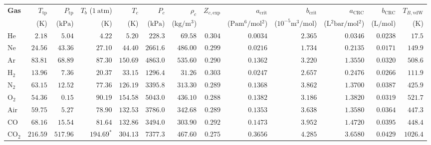 \begin{table}[!htbp]
\centering
{}\label{tab:06:vdw-constants}
\footnotesize\setlength{\tabcolsep}{3.5pt}\renewcommand{\arraystretch}{1.08}
\begin{tabularx}{\linewidth}{@{}l r r r r r r r r r r r r@{}}
\toprule
\textbf{Gas} & $T_{\mathrm{tp}}$ & $P_{\mathrm{tp}}$ & $T_b$ ($\SI{1}{\text{atm}}$) & $T_c$ & $P_c$ & $\rho_c$ & $Z_{c,\mathrm{exp}}$ & $a_{\mathrm{crit}}$ & $b_{\mathrm{crit}}$ & $a_{\mathrm{CRC}}$ & $b_{\mathrm{CRC}}$ & $T_{B,\mathrm{vdW}}$ \\
 & ($\si{\kelvin}$) & ($\si{\kilo\pascal}$) & ($\si{\kelvin}$) & ($\si{\kelvin}$) & ($\si{\kilo\pascal}$) & ($\si{\kilogram\per\cubic\meter}$) & & ($\si{\pascal\meter^6\per\mole^2}$) & ($10^{-5}\si{\cubic\meter\per\mole}$) & ($\si{\liter^2\bar\per\mole^2}$) & ($\si{\liter\per\mole}$) & ($\si{\kelvin}$) \\
\midrule
$\mathrm{He}$ & $2.18$ & $5.04$ & $4.22$ & $5.20$ & $228.3$ & $69.58$ & $0.304$ & $0.0034$ & $2.365$ & $0.0346$ & $0.0238$ & $17.5$ \\
$\mathrm{Ne}$ & $24.56$ & $43.36$ & $27.10$ & $44.40$ & $2661.6$ & $486.00$ & $0.299$ & $0.0216$ & $1.734$ & $0.2135$ & $0.0171$ & $149.9$ \\
$\mathrm{Ar}$ & $83.81$ & $68.89$ & $87.30$ & $150.69$ & $4863.0$ & $535.60$ & $0.290$ & $0.1362$ & $3.220$ & $1.3550$ & $0.0320$ & $508.6$ \\
$\mathrm{H_2}$ & $13.96$ & $7.36$ & $20.37$ & $33.15$ & $1296.4$ & $31.26$ & $0.303$ & $0.0247$ & $2.657$ & $0.2476$ & $0.0266$ & $111.9$ \\
$\mathrm{N_2}$ & $63.15$ & $12.52$ & $77.36$ & $126.19$ & $3395.8$ & $313.30$ & $0.289$ & $0.1368$ & $3.862$ & $1.3700$ & $0.0387$ & $425.9$ \\
$\mathrm{O_2}$ & $54.36$ & $0.15$ & $90.19$ & $154.58$ & $5043.0$ & $436.10$ & $0.288$ & $0.1382$ & $3.186$ & $1.3820$ & $0.0319$ & $521.7$ \\
$\mathrm{Air}$ & $59.75$ & $5.27$ & $78.90$ & $132.53$ & $3786.0$ & $342.68$ & $0.289$ & $0.1353$ & $3.638$ & $1.3580$ & $0.0364$ & $447.3$ \\
$\mathrm{CO}$ & $68.16$ & $15.54$ & $81.64$ & $132.86$ & $3494.0$ & $303.90$ & $0.292$ & $0.1473$ & $3.952$ & $1.4720$ & $0.0395$ & $448.4$ \\
$\mathrm{CO_2}$ & $216.59$ & $517.96$ & $194.69^*$ & $304.13$ & $7377.3$ & $467.60$ & $0.275$ & $0.3656$ & $4.285$ & $3.6580$ & $0.0429$ & $1026.4$ \\

\end{tabularx}
\end{table}
